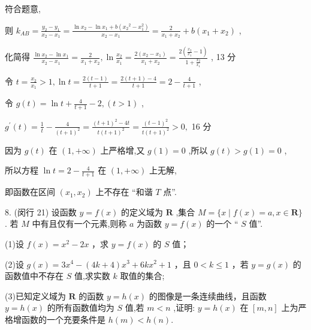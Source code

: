 \documentclass[10pt]{article}
\begin{document}
符合题意,

则 \({k}_{AB} = \frac{{y}_{2} - {y}_{1}}{{x}_{2} - {x}_{1}} = \frac{\ln {x}_{2} - \ln {x}_{1} + b\left( {{x}_{2}{}^{2} - {x}_{1}^{2}}\right) }{{x}_{2} - {x}_{1}} = \frac{2}{{x}_{1} + {x}_{2}} + b\left( {{x}_{1} + {x}_{2}}\right)\) ,

化简得 \(\frac{\ln {x}_{2} - \ln {x}_{1}}{{x}_{2} - {x}_{1}} = \frac{2}{{x}_{1} + {x}_{2}},\ln \frac{{x}_{2}}{{x}_{1}} = \frac{2\left( {{x}_{2} - {x}_{1}}\right) }{{x}_{1} + {x}_{2}} = \frac{2\left( {\frac{{x}_{2}}{{x}_{1}} - 1}\right) }{1 + \frac{{x}_{2}}{{x}_{1}}}\) , 13 分

令 \(t = \frac{{x}_{2}}{{x}_{1}} > 1,\ln t = \frac{2\left( {t - 1}\right) }{t + 1} = \frac{2\left( {t + 1}\right)  - 4}{t + 1} = 2 - \frac{4}{t + 1}\) ,

令 \(g\left( t\right)  = \ln t + \frac{4}{t + 1} - 2,\left( {t > 1}\right)\) ,

\({g}^{\prime }\left( t\right)  = \frac{1}{t} - \frac{4}{{\left( t + 1\right) }^{2}} = \frac{{\left( t + 1\right) }^{2} - {4t}}{t{\left( t + 1\right) }^{2}} = \frac{{\left( t - 1\right) }^{2}}{t{\left( t + 1\right) }^{2}} > 0,\) 16 分

因为 \(g\left( t\right)\) 在 \(\left( {1, + \infty }\right)\) 上严格增,又 \(g\left( 1\right)  = 0\) ,所以 \(g\left( t\right)  > g\left( 1\right)  = 0\) ,

所以方程 \(\ln t = 2 - \frac{4}{t + 1}\) 在 \(\left( {1, + \infty }\right)\) 上无解,

即函数在区间 \(\left( {{x}_{1},{x}_{2}}\right)\) 上不存在 “和谐 \(T\) 点”.

8. (闵行 21) 设函数 \(y = f\left( x\right)\) 的定义域为 \(\mathbf{R}\) ,集合 \(M = \{ x \mid  f\left( x\right)  = a,x \in  \mathbf{R}\}\) . 若 \(M\) 中有且仅有一个元素,则称 \(a\) 为函数 \(y = f\left( x\right)\) 的一个 “ \(S\) 值”.

(1)设 \(f\left( x\right)  = {x}^{2} - {2x}\) ，求 \(y = f\left( x\right)\) 的 \(S\) 值；

(2)设 \(g\left( x\right)  = 3{x}^{4} - \left( {{4k} + 4}\right) {x}^{3} + {6k}{x}^{2} + 1\) ，且 \(0 < k \leq  1\) ，若 \(y = g\left( x\right)\) 的函数值中不存在 \(S\) 值,求实数 \(k\) 取值的集合;

(3)已知定义域为 \(\mathbf{R}\) 的函数 \(y = h\left( x\right)\) 的图像是一条连续曲线，且函数 \(y = h\left( x\right)\) 的所有函数值均为 \(S\) 值,若 \(m < n\) ,证明: \(y = h\left( x\right)\) 在 \(\left\lbrack  {m,n}\right\rbrack\) 上为严格增函数的一个充要条件是 \(h\left( m\right)  < h\left( n\right) .\)
\end{document}

